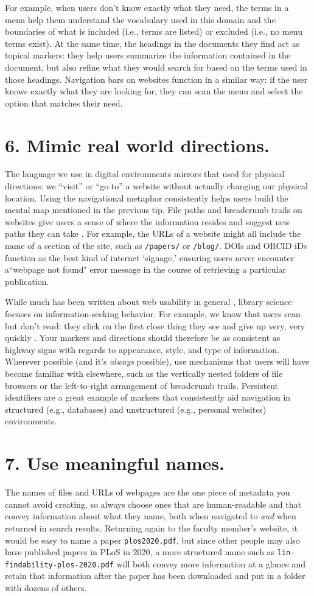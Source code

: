 \documentclass[10pt,letterpaper]{article}
\newcommand{\rulemajor}[1]{\section*{#1}}
\begin{document}
For example, when users don't know exactly what they need, the terms in a menu
help them understand the vocabulary used in this domain and the boundaries of
what is included (i.e., terms are listed) or excluded (i.e., no menu terms
exist). At the same time, the headings in the documents they find act as topical
markers: they help users summarize the information contained in the document,
but also refine what they would search for based on the terms used in those
headings. Navigation bars on websites function in a similar way: if the user
knows exactly what they are looking for, they can scan the menu and select the
option that matches their need.

\rulemajor{6. Mimic real world directions.}

The language we use in digital environments mirrors that used for physical
directions: we ``visit'' or ``go to'' a website without actually changing our
physical location. Using the navigational metaphor consistently helps users
build the mental map mentioned in the previous tip. File paths and breadcrumb
trails on websites give users a sense of where the information resides and
suggest new paths they can take \cite{Krug2014}. For example, the URLs of a
website might all include the name of a section of the site, such as
\texttt{/papers/} or \texttt{/blog/}.  
DOIs and ORCID iDs function as the best kind of internet `signage,' ensuring users never encounter a``webpage not found" error message in the course of retrieving a particular publication.

While much has been written about web usability in general
\cite{Covert2014,NNG2020}, library science focuses on information-seeking
behavior.  For example, we know that users scan but don't read: they click on
the first close thing they see and give up very, very quickly
\cite{Bates2002}. Your markers and directions should therefore be as consistent
as highway signs with regards to appearance, style, and type of
information. Wherever possible (and it's \emph{always} possible), use mechanisms
that users will have become familiar with elsewhere, such as the vertically
nested folders of file browsers or the left-to-right arrangement of breadcrumb
trails. Persistent identifiers are a great example of markers that consistently aid navigation in structured (e.g., databases) and unstructured (e.g., personal websites) environments.

\rulemajor{7. Use meaningful names.}

The names of files and URLs of webpages are the one piece of metadata you cannot
avoid creating, so always choose ones that are human-readable and that convey
information about what they name, both when navigated to \emph{and} when
returned in search results. Returning again to the faculty member's website, it
would be easy to name a paper \texttt{plos2020.pdf}, but since other people may
also have published papers in PLoS in 2020, a more structured name such as
\texttt{lin-findability-plos-2020.pdf} will both convey more information at a
glance and retain that information after the paper has been downloaded and put
in a folder with dozens of others.
\end{document}
